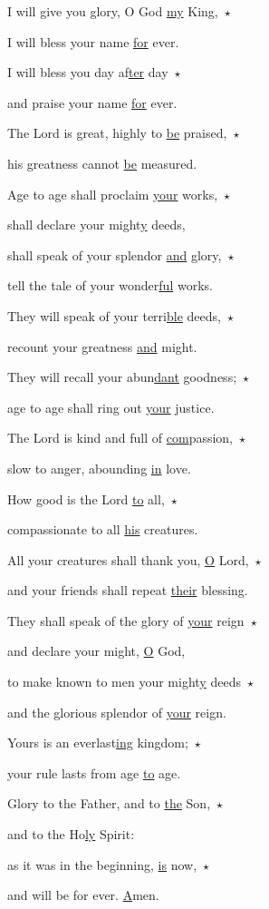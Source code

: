 \noindent I will give you glory, O God \uline{my} King,~$\star$~\nopagebreak

I will bless your name \uline{for} ever.

\noindent I will bless you day af\uline{ter} day~$\star$~\nopagebreak

and praise your name \uline{for} ever.

\noindent The Lord is great, highly to \uline{be} praised,~$\star$~\nopagebreak

his greatness cannot \uline{be} measured.

\noindent Age to age shall proclaim \uline{your} works,~$\star$~\nopagebreak

shall declare your might\uline{y} deeds,

\noindent shall speak of your splendor \uline{and} glory,~$\star$~\nopagebreak

tell the tale of your wonder\uline{ful} works.

\noindent They will speak of your terri\uline{ble} deeds,~$\star$~\nopagebreak

recount your greatness \uline{and} might.

\noindent They will recall your abun\uline{dant} goodness;~$\star$~\nopagebreak

age to age shall ring out \uline{your} justice.

\noindent The Lord is kind and full of \uline{com}passion,~$\star$~\nopagebreak

slow to anger, abounding \uline{in} love.

\noindent How good is the Lord \uline{to} all,~$\star$~\nopagebreak

compassionate to all \uline{his} creatures.

\noindent All your creatures shall thank you, \uline{O} Lord,~$\star$~\nopagebreak

and your friends shall repeat \uline{their} blessing.

\noindent They shall speak of the glory of \uline{your} reign~$\star$~\nopagebreak

and declare your might, \uline{O} God,

\noindent to make known to men your might\uline{y} deeds~$\star$~\nopagebreak

and the glorious splendor of \uline{your} reign.

\noindent Yours is an everlast\uline{ing} kingdom;~$\star$~\nopagebreak

your rule lasts from age \uline{to} age.

\noindent Glory to the Father, and to \uline{the} Son,~$\star$~\nopagebreak

and to the Ho\uline{ly} Spirit:

\noindent as it was in the beginning, \uline{is} now,~$\star$~\nopagebreak

and will be for ever. \uline{A}men.
